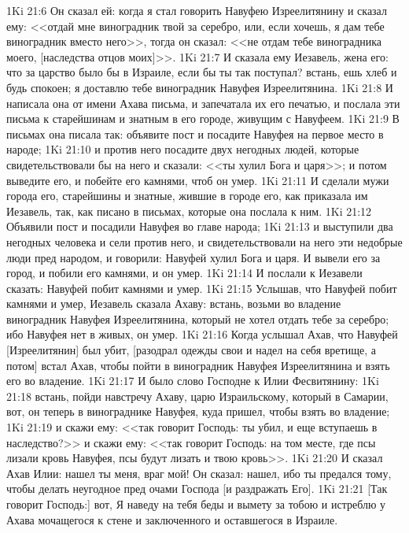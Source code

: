 \vs 1Ki 21:6 Он сказал ей: когда я стал говорить Навуфею Изреелитянину и сказал ему: <<отдай мне виноградник твой за серебро, или, если хочешь, я дам тебе  виноградник вместо него>>, тогда он сказал: <<не отдам тебе виноградника моего, [наследства отцов моих]>>.
\vs 1Ki 21:7 И сказала ему Иезавель, жена его: что за царство было бы в Израиле, если бы ты так поступал? встань, ешь хлеб и будь спокоен; я доставлю тебе виноградник Навуфея Изреелитянина.
\vs 1Ki 21:8 И написала она от имени Ахава письма, и запечатала их его печатью, и послала эти письма к старейшинам и знатным в его городе, живущим с Навуфеем.
\vs 1Ki 21:9 В письмах она писала так: объявите пост и посадите Навуфея на первое место в народе;
\vs 1Ki 21:10 и против него посадите двух негодных людей, которые свидетельствовали бы на него и сказали: <<ты хулил Бога и царя>>; и потом выведите его, и побейте его камнями, чтоб он умер.
\vs 1Ki 21:11 И сделали мужи города его, старейшины и знатные, жившие в городе его, как приказала им Иезавель, так, как писано в письмах, которые она послала к ним.
\vs 1Ki 21:12 Объявили пост и посадили Навуфея во главе народа;
\vs 1Ki 21:13 и выступили два негодных человека и сели против него, и свидетельствовали на него эти недобрые люди пред народом, и говорили: Навуфей хулил Бога и царя. И вывели его за город, и побили его камнями, и он умер.
\vs 1Ki 21:14 И послали к Иезавели сказать: Навуфей побит камнями и умер.
\vs 1Ki 21:15 Услышав, что Навуфей побит камнями и умер, Иезавель сказала Ахаву: встань, возьми во владение виноградник Навуфея Изреелитянина, который не хотел отдать тебе за серебро; ибо Навуфея нет в живых, он умер.
\vs 1Ki 21:16 Когда услышал Ахав, что Навуфей [Изреелитянин] был убит, [разодрал одежды свои и надел на себя вретище, а потом] встал Ахав, чтобы пойти в виноградник Навуфея Изреелитянина и взять его во владение.
\rsbpar\vs 1Ki 21:17 И было слово Господне к Илии Фесвитянину:
\vs 1Ki 21:18 встань, пойди навстречу Ахаву, царю Израильскому, который в Самарии, вот, он теперь в винограднике Навуфея, куда пришел, чтобы взять  во владение;
\vs 1Ki 21:19 и скажи ему: <<так говорит Господь: ты убил, и еще вступаешь в наследство?>> и скажи ему: <<так говорит Господь: на том месте, где псы лизали кровь Навуфея, псы будут лизать и твою кровь>>.
\vs 1Ki 21:20 И сказал Ахав Илии: нашел ты меня, враг мой! Он сказал: нашел, ибо ты предался тому, чтобы делать неугодное пред очами Господа [и раздражать Его].
\vs 1Ki 21:21 [Так говорит Господь:] вот, Я наведу на тебя беды и вымету за тобою и истреблю у Ахава мочащегося к стене и заключенного и оставшегося в Израиле.
